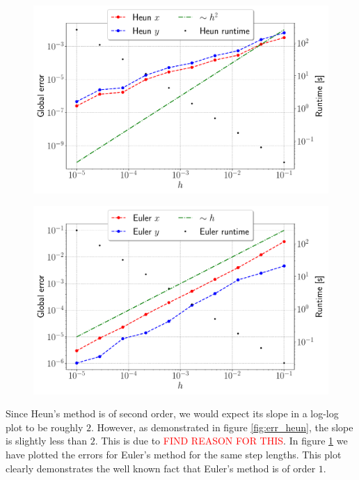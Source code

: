 \begin{figure}[htb]
	\centering
	\begin{minipage}{0.49\columnwidth}
	\centering
	\includegraphics[width =\columnwidth]{../fig/err_heun.pdf}
	\label{fig:err_heun}
	\end{minipage}
	\hfill
	\begin{minipage}{0.49\columnwidth}
	\centering
	\includegraphics[width = \columnwidth]{../fig/err_euler.pdf}
	\label{fig:err_euler}
	\end{minipage}
\end{figure}
Since Heun's method is of second order, we would expect its slope in a log-log plot to be roughly $2$. However, as demonstrated in figure \ref{fig:err_heun}, the slope is slightly less than $2$. This is due to \textcolor{red}{FIND REASON FOR THIS}. In figure \ref{fig:err_euler} we have plotted the errors for Euler's method for the same step lengths. This plot clearly demonstrates the well known fact that Euler's method is of order $1$.




